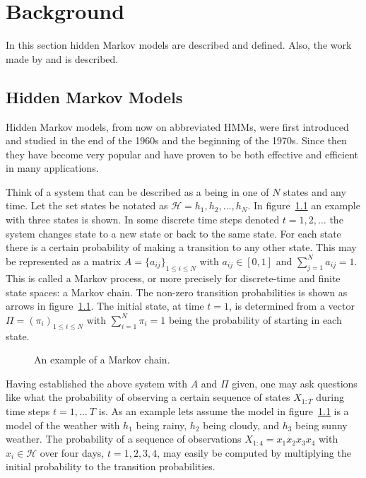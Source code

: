 
\chapter{Background}
\label{cha:background}

In this section hidden Markov models are described and defined. Also, the work
made by \citet{lifshits2009speeding} and \citet{sand2013ziphmmlib} is described.

\section{Hidden Markov Models}
\label{sec:hidden-markov-models}

Hidden Markov models, from now on abbreviated HMMs, were first introduced and
studied in the end of the 1960s and the beginning of the 1970s. Since then they
have become very popular and have proven to be both effective and efficient in
many applications. \citep{rabiner1989tutorial}

Think of a system that can be described as a being in one of $N$ states and any
time. Let the set states be notated as $\mathcal{H} = {h_1, h_2, \dots, h_N}$.
In figure~\ref{fig:markov-chain} an example with three states is shown. In some
discrete time steps denoted $t = 1, 2, \dots$ the system changes state to a new
state or back to the same state. For each state there is a certain probability
of making a transition to any other state. This may be represented as a matrix
$A = {\{a_{ij}\}}_{1 \le i \le N}$ with $a_{ij} \in [0, 1]$ and
$\sum_{j = 1}^N a_{ij} = 1$. This is called a Markov process, or more precisely
for discrete-time and finite state spaces: a Markov chain. The non-zero
transition probabilities is shown as arrows in
figure~\ref{fig:markov-chain}. The initial state, at time $t = 1$, is
determined from a vector $\Pi = {(\pi_i)}_{1 \le i \le N}$ with
$\sum_{i=1}^N \pi_i = 1$ being the probability of starting in each state.

\begin{figure}
  \centering
  
  \caption{An example of a Markov chain.}
  \label{fig:markov-chain}
\end{figure}

Having established the above system with $A$ and $\Pi$ given, one may ask
questions like what the probability of observing a certain sequence of states
$X_{1:T}$ during time steps $t = 1, \dots\ T$ is. As an example lets assume the
model in figure~\ref{fig:markov-chain} is a model of the weather with $h_1$
being rainy, $h_2$ being cloudy, and $h_3$ being sunny weather. The probability
of a sequence of observations $X_{1:4} = x_1x_2x_3x_4$ with
$x_i \in \mathcal{H}$ over four days, $t = 1, 2, 3, 4$, may easily be computed
by multiplying the initial probability to the transition probabilities.

